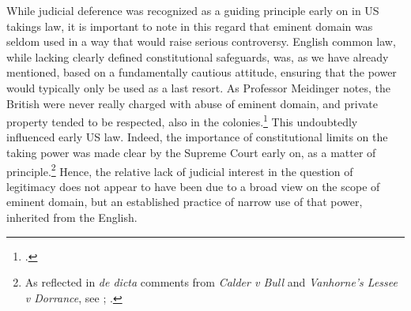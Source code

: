 While judicial deference was recognized as a guiding principle early on in US takings law, it is important to note in this regard that eminent domain was seldom used in a way that would raise serious controversy. English common law, while lacking clearly defined constitutional safeguards, was, as we have already mentioned, based on a fundamentally cautious attitude, ensuring that the power would typically only be used as a last resort. As Professor Meidinger notes, the British were never really charged with abuse of eminent domain, and private property tended to be respected, also in the colonies.\footcite[17]{meidinger80} This undoubtedly influenced early US law. Indeed, the importance of constitutional limits on the taking power was made clear by the Supreme Court early on, as a matter of principle.\footnote{As reflected in {\it de dicta} comments from {\it Calder v Bull} and {\it Vanhorne’s Lessee v Dorrance}, see \cite[388]{calder98}; \cite[310]{vanhorne95}.} Hence, the relative lack of judicial interest in the question of legitimacy does not appear to have been due to a broad view on the scope of eminent domain, but an established practice of narrow use of that power, inherited from the English.
